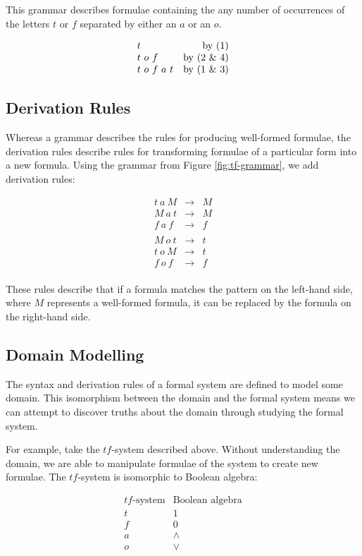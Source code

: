 This grammar describes formulae containing the any number of occurrences of
the letters $t$ or $f$ separated by either an $a$ or an $o$.

\[
\begin{array}{lr}
  t & \text{by (1)} \\
  t\ o\ f & \text{by (2 \& 4)} \\
  t\ o\ f\ a\ t & \text{by (1 \& 3)}
\end{array}
\]

\subsection{Derivation Rules}
Whereas a grammar describes the rules for producing well-formed formulae,
the derivation rules describe rules for transforming formulae of a
particular form into a new formula. Using the grammar from Figure 
\ref{fig:tf-grammar}, we add derivation rules:

\[
\begin{array}{lcl}
  t\ a\ M &\to& M \\ 
  M\ a\ t &\to& M \\
  f\ a\ f &\to& f \\
  \\
  M\ o\ t &\to& t \\ 
  t\ o\ M &\to& t \\
  f\ o\ f &\to& f \\
\end{array}
\]

These rules describe that if a formula matches the pattern on the 
left-hand side, where $M$ represents a well-formed formula, it can be
replaced by the formula on the right-hand side.

\subsection{Domain Modelling}

The syntax and derivation rules of a formal system are defined to model 
some domain. This isomorphism between the domain and the formal system
means we can attempt to discover truths about the domain through studying
the formal system.

For example, take the $tf$-system described above. Without
understanding the domain, we are able to manipulate formulae of the
system to create new formulae. The $tf$-system is isomorphic to
Boolean algebra:

\[
\begin{array}{cc}
\text{$tf$-system} & \text{Boolean algebra} \\
t & 1 \\
f & 0 \\
a & \wedge \\
o & \vee 
\end{array}
\]

